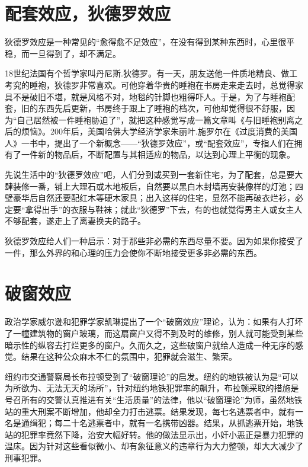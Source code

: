 \documentclass[11pt]{ctexart}
\begin{document}
\section{配套效应，狄德罗效应}
\label{sec-78}


狄德罗效应是一种常见的“愈得愈不足效应”，在没有得到某种东西时，心里很平稳，而一旦得到了，却不满足。

18世纪法国有个哲学家叫丹尼斯.狄德罗。有一天，朋友送他一件质地精良、做工考究的睡袍，狄德罗非常喜欢。可他穿着华贵的睡袍在书房走来走去时，总觉得家具不是破旧不堪，就是风格不对，地毯的针脚也粗得吓人。于是，为了与睡袍配套，旧的东西先后更新，书房终于跟上了睡袍的档次，可他却觉得很不舒服，因为“自己居然被一件睡袍胁迫了”，就把这种感觉写成一篇文章叫《与旧睡袍别离之后的烦恼》。200年后，美国哈佛大学经济学家朱丽叶.施罗尔在《过度消费的美国人》一书中，提出了一个新概念——“狄德罗效应”，或“配套效应”，专指人们在拥有了一件新的物品后，不断配置与其相适应的物品，以达到心理上平衡的现象。

先说生活中的“狄德罗效应”吧，人们分到或买到一套新住宅，为了配套，总是要大肆装修一番，铺上大理石或木地板后，自然要以黑白木封墙再安装像样的灯池；四壁豪华后自然还要配红木等硬木家具；出入这样的住宅，显然不能再破衣烂衫，必定要“拿得出手”的衣服与鞋袜；就此“狄德罗”下去，有的也就觉得男主人或女主人不够配套，遂走上了离妻换夫的路子。

狄德罗效应给人们一种启示：对于那些非必需的东西尽量不要。因为如果你接受了一件，那么外界的和心理的压力会使你不断地接受更多非必需的东西。
\section{破窗效应}
\label{sec-79}


政治学家威尔逊和犯罪学家凯琳提出了一个“破窗效应”理论，认为：如果有人打坏了一幢建筑物的窗户玻璃，而这扇窗户又得不到及时的维修，别人就可能受到某些暗示性的纵容去打烂更多的窗户。久而久之，这些破窗户就给人造成一种无序的感觉。结果在这种公众麻木不仁的氛围中，犯罪就会滋生、繁荣。

纽约市交通警察局长布拉顿受到了“破窗理论”的启发。纽约的地铁被认为是“可以为所欲为、无法无天的场所”，针对纽约地铁犯罪率的飙升，布拉顿采取的措施是号召所有的交警认真推进有关“生活质量”的法律，他以“破窗理论”为师，虽然地铁站的重大刑案不断增加，他却全力打击逃票。结果发现，每七名逃票者中，就有一名是通缉犯；每二十名逃票者中，就有一名携带凶器。结果，从抓逃票开始，地铁站的犯罪率竟然下降，治安大幅好转。他的做法显示出，小奸小恶正是暴力犯罪的温床。因为针对这些看似微小、却有象征意义的违章行为大力整顿，却大大减少了刑事犯罪。
\end{document}
